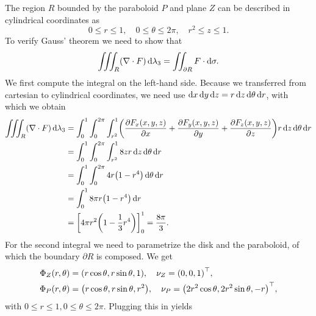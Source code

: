 \documentclass[english]{exercise}
\begin{document}
	The region \(R\) bounded by the paraboloid \(P\) and plane \(Z\) can be described in cylindrical coordinates as
	\[
		0 \le r \le 1, \quad 0 \le \theta \le 2\pi, \quad r^2 \le z \le 1.
	\]
	To verify Gauss' theorem we need to show that
	\[
		\iiint_R \parentheses*{\nabla \cdot F}\d\lambda_3 = \iint_{\partial R}F \cdot \d\sigma.
	\]
	We first compute the integral on the left-hand side.
	Because we transferred from cartesian to cylindrical coordinates, we need use \(\mathop{\mathrm{d}\!} x\mathop{\mathrm{d}\!} y\mathop{\mathrm{d}\!} z = r\mathop{\mathrm{d}\!} z\mathop{\mathrm{d}\!}\theta\mathop{\mathrm{d}\!} r\), with which we obtain
	\begin{align*}
		\iiint_R \parentheses*{\nabla \cdot F}\d\lambda_3 &= \int_0^1 \int_0^{2\pi}\int_{r^2}^1 \parentheses*{\frac{\partial F_x\parentheses*{x, y, z}}{\partial x} + \frac{\partial F_y\parentheses*{x, y, z}}{\partial y} + \frac{\partial F_z\parentheses*{x, y, z}}{\partial z}}r\d z\d\theta\d r\\
		&= \int_0^1 \int_0^{2\pi}\int_{r^2}^1 8zr\d z\d\theta\d r\\
		&= \int_0^1 \int_0^{2\pi}4r\parentheses*{1 - r^4}\d\theta\d r\\
		&= \int_0^1 8\pi r\parentheses*{1 - r^4}\d r\\
		&= \brackets*{4\pi r^2 \parentheses*{1 - \frac{1}{3}r^4}}_0^1 = \frac{8\pi}{3}.
	\end{align*}
	For the second integral we need to parametrize the disk and the paraboloid, of which the boundary \(\partial R\) is composed.
	We get
	\begin{align*}
		\Phi_Z\parentheses*{r, \theta} &= \parentheses*{r\cos\theta, r\sin\theta, 1}, \quad \nu_Z = \parentheses*{0, 0, 1}^\top,\\
		\Phi_P\parentheses*{r, \theta} &= \parentheses*{r\cos\theta, r\sin\theta, r^2}, \quad \nu_P = \parentheses*{2r^2 \cos\theta, 2r^2 \sin\theta, -r}^\top,
	\end{align*}
	with \(0 \le r \le 1, 0 \le \theta \le 2\pi\).
	Plugging this in yields
\end{document}
